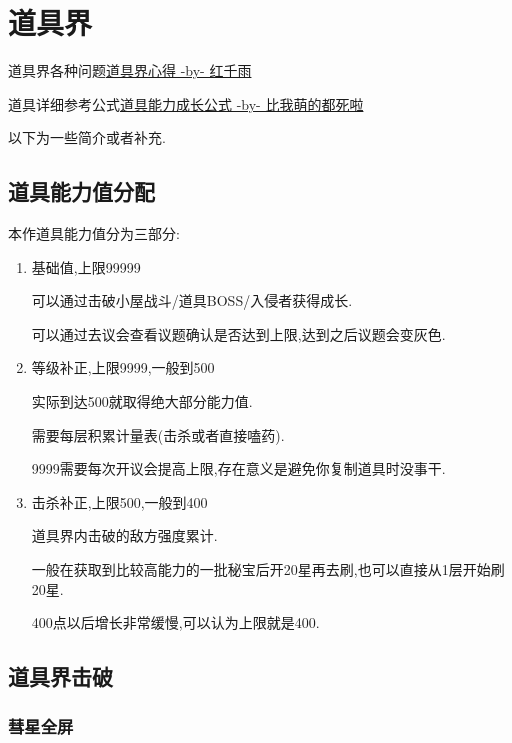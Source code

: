 \newpage

\section{道具界}

道具界各种问题\href{http://tieba.baidu.com/p/3730196003}{道具界心得 -by- 红千雨}

道具详细参考公式\href{http://tieba.baidu.com/f?kz=3834692385}{道具能力成长公式 -by- 比我萌的都死啦}

以下为一些简介或者补充.

	\subsection{道具能力值分配}
	
	本作道具能力值分为三部分:

	\begin{enumerate}

		\item 
		基础值,上限99999

		可以通过击破小屋战斗/道具BOSS/入侵者获得成长.

		可以通过去议会查看议题确认是否达到上限,达到之后议题会变灰色.

		\item
		等级补正,上限9999,一般到500

		实际到达500就取得绝大部分能力值.

		需要每层积累计量表(击杀或者直接嗑药).

		9999需要每次开议会提高上限,存在意义是避免你复制道具时没事干.

		\item
		击杀补正,上限500,一般到400

		道具界内击破的敌方强度累计.

		一般在获取到比较高能力的一批秘宝后开20星再去刷,也可以直接从1层开始刷20星.

		400点以后增长非常缓慢,可以认为上限就是400.

	\end{enumerate}
	
	\newpage

	\subsection{道具界击破}

		\subsubsection{彗星全屏}

